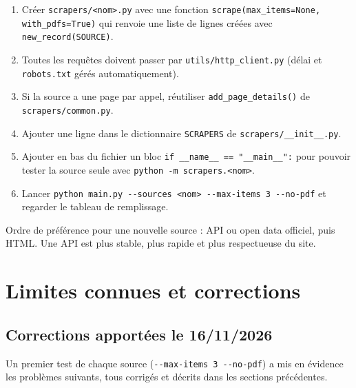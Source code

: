 \documentclass[11pt,a4paper]{article}
\newcommand{\code}[1]{\texttt{#1}}
\begin{document}
\begin{enumerate}
  \item Créer \code{scrapers/<nom>.py} avec une fonction
        \code{scrape(max\_items=None, with\_pdfs=True)} qui renvoie une liste de lignes créées
        avec \code{new\_record(SOURCE)}.
  \item Toutes les requêtes doivent passer par \code{utils/http\_client.py} (délai et
        \code{robots.txt} gérés automatiquement).
  \item Si la source a une page par appel, réutiliser \code{add\_page\_details()} de
        \code{scrapers/common.py}.
  \item Ajouter une ligne dans le dictionnaire \code{SCRAPERS} de \code{scrapers/\_\_init\_\_.py}.
  \item Ajouter en bas du fichier un bloc \code{if \_\_name\_\_ == "\_\_main\_\_":} pour pouvoir
        tester la source seule avec \code{python -m scrapers.<nom>}.
  \item Lancer \code{python main.py -{}-sources <nom> -{}-max-items 3 -{}-no-pdf} et regarder le
        tableau de remplissage.
\end{enumerate}

Ordre de préférence pour une nouvelle source : API ou open data officiel, puis HTML. Une
API est plus stable, plus rapide et plus respectueuse du site.

\section{Limites connues et corrections}
\label{sec:limites}

\subsection{Corrections apportées le 16/11/2026}

Un premier test de chaque source (\code{-{}-max-items 3 -{}-no-pdf}) a mis en évidence les
problèmes suivants, tous corrigés et décrits dans les sections précédentes.
\end{document}
